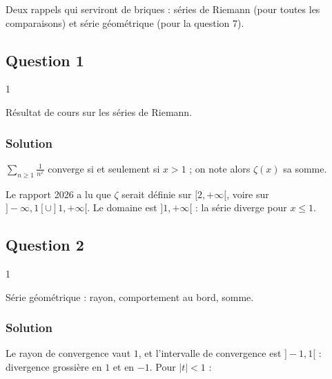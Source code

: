 \documentclass[11pt,a4paper]{article}
\newcommand{\equationajustee}[1]{%
  \sbox{\boiteequation}{$\displaystyle #1$}%
  \ifdim\wd\boiteequation>\linewidth
    \[\resizebox{\linewidth}{!}{\usebox{\boiteequation}}\]%
  \else
    \[#1\]%
  \fi}
\begin{document}
Deux rappels qui serviront de briques : séries de Riemann (pour toutes les comparaisons) et série géométrique (pour la question 7).

\hypertarget{question-1-1}{%
\subsection{Question 1}\label{question-1-1}}

\begin{indication}{1}

Résultat de cours sur les séries de Riemann.

\end{indication}

\hypertarget{solution-17}{%
\subsubsection{Solution}\label{solution-17}}

\(\sum_{n\ge1}\frac1{n^x}\) converge si et seulement si \(x>1\) ; on note alors \(\zeta(x)\) sa somme.

\begin{piege}

Le rapport 2026 a lu que \(\zeta\) serait définie sur \([2,+\infty[\), voire sur \(]-\infty,1[\cup]1,+\infty[\). Le domaine est \(]1,+\infty[\) : la série diverge pour \(x\le1\).

\end{piege}

\hypertarget{question-2-1}{%
\subsection{Question 2}\label{question-2-1}}

\begin{indication}{1}

Série géométrique : rayon, comportement au bord, somme.

\end{indication}

\hypertarget{solution-18}{%
\subsubsection{Solution}\label{solution-18}}

Le rayon de convergence vaut \(1\), et l'intervalle de convergence est \(]-1,1[\) : divergence grossière en \(1\) et en \(-1\). Pour \(|t|<1\) :
\equationajustee{\sum_{n=0}^{+\infty}t^n=\frac1{1-t}.}
\end{document}

